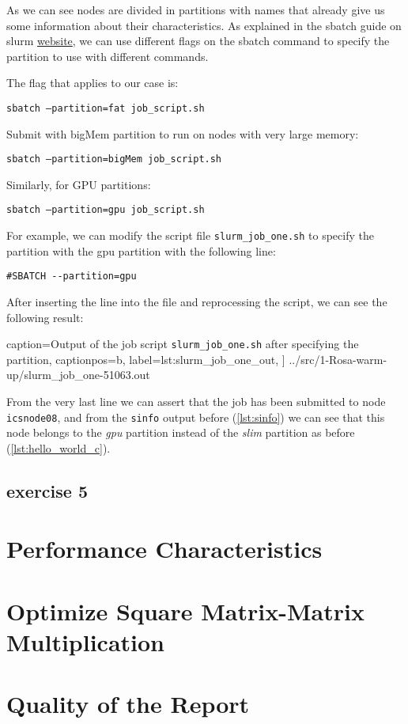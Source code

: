 \documentclass[unicode,11pt,a4paper,oneside,numbers=endperiod,openany]{scrartcl}
\begin{document}
As we can see nodes are divided in partitions with names that already give us some information about their characteristics.
As explained in the sbatch guide on slurm \href{https://slurm.schedmd.com/sbatch.html}{website}, we can use different flags on the sbatch command to specify the partition to use with different commands.


The flag that applies to our case is:

\quad\quad\texttt{sbatch --partition=fat job\_script.sh}

Submit with bigMem partition to run on nodes with very large memory:

\quad\quad\texttt{sbatch --partition=bigMem job\_script.sh}

Similarly, for GPU partitions:

\quad\quad\texttt{sbatch --partition=gpu job\_script.sh}

For example, we can modify the script file \texttt{slurm\_job\_one.sh} to specify the partition with the gpu partition with the following line:
\begin{verbatim}
#SBATCH --partition=gpu
\end{verbatim}

After inserting the line into the file and reprocessing the script, we can see the following result:


    caption={Output of the job script \texttt{slurm\_job\_one.sh} after specifying the partition},
    captionpos=b,
    label={lst:slurm_job_one_out},
]
{../src/1-Rosa-warm-up/slurm_job_one-51063.out}

From the very last line we can assert that the job has been submitted to node \texttt{icsnode08}, and from the \texttt{sinfo} output before (\ref{lst:sinfo}) we can see that this node belongs to the \textit{gpu} partition instead of the \textit{slim} partition as before (\ref{lst:hello_world_c}).

\subsection{exercise 5}




\section{Performance Characteristics }


\section{Optimize Square Matrix-Matrix Multiplication  }


\section{Quality of the Report  }
\end{document}
